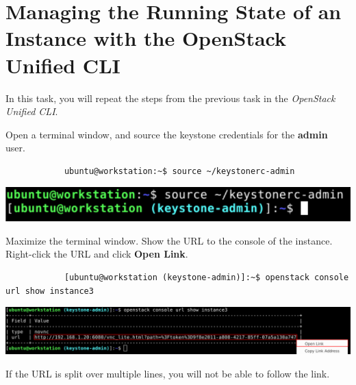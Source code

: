 \documentclass[letterpaper, 12pt]{article}
\begin{document}
\section{Managing the Running State of an Instance with the OpenStack Unified CLI}\label{sec:managing-the-power-state-of-an-instance-with-the-openstack-unified-cli}
In this task, you will repeat the steps from the previous task in the \textit{OpenStack Unified CLI}.

\begin{enumerate}
    \begin{labstep}
        Open a terminal window, and source the keystone credentials for the \textbf{admin} user.
        \begin{lstlisting}
            ubuntu@workstation:~$ source ~/keystonerc-admin
        \end{lstlisting}

        \begin{center}
            \includegraphics[width=\linewidth]{images/part4/step1.png}
        \end{center}
    \end{labstep}

    \begin{labstep}
        Maximize the terminal window.
        Show the URL to the console of the instance.
        Right-click the URL and click \textbf{Open Link}.
        \begin{lstlisting}
            [ubuntu@workstation (keystone-admin)]:~$ openstack console url show instance3
        \end{lstlisting}

        \begin{center}
            \includegraphics[width=\linewidth]{images/part4/step2.png}
        \end{center}
    \end{labstep}

    \begin{tipbox}
        If the URL is split over multiple lines, you will not be able to follow the link.
    \end{tipbox}


\end{enumerate}
\end{document}
